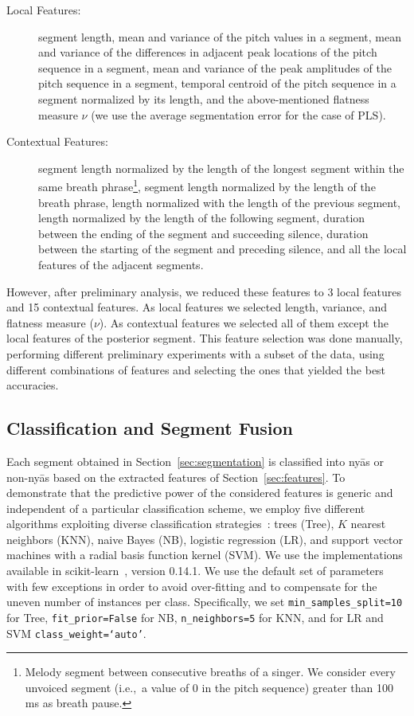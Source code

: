 \begin{description}
	\item[Local Features:] segment length, mean and variance of the pitch values in a segment, mean and variance of the differences in adjacent peak locations of the pitch sequence in a segment, mean and variance of the  peak amplitudes of the pitch sequence in a segment, temporal centroid of the pitch sequence in a segment normalized by its length, and the above-mentioned flatness measure $\nu$ (we use the average segmentation error for the case of PLS).
	\item[Contextual Features:] segment length normalized by the length of the longest segment within the same breath phrase\footnote{Melody segment between consecutive breaths of a singer. We consider every unvoiced segment (i.e.,~a value of 0 in the pitch sequence) greater than 100\,ms as breath pause.}, segment length normalized by the length of the breath phrase, length normalized with the length of the previous segment, length normalized by the length of the following segment, duration between the ending of the segment and succeeding silence, duration between the starting of the segment and preceding silence, and all the local features of the adjacent segments.
\end{description}

However, after preliminary analysis, we reduced these features to 3 local features and 15 contextual features. As local features we selected length, variance, and flatness measure ($\nu$). As contextual features we selected all of them except the local features of the posterior segment. This feature selection was done manually, performing different preliminary experiments with a subset of the data, using different combinations of features and selecting the ones that yielded the best accuracies.

\subsection{Classification and Segment Fusion}

Each segment obtained in Section~\ref{sec:segmentation} is classified into ny\={a}s or non-ny\={a}s based on the extracted features of Section~\ref{sec:features}. To demonstrate that the predictive power of the considered features is generic and independent of a particular classification scheme, we employ five different algorithms exploiting diverse classification strategies~\cite{Hastie09BOOK}: trees (Tree), $K$ nearest neighbors (KNN), naive Bayes (NB), logistic regression (LR), and support vector machines with a radial basis function kernel (SVM). We use the implementations available in scikit-learn~\cite{scikitlearn}, version 0.14.1. We use the default set of parameters with few exceptions in order to avoid over-fitting and to compensate for the uneven number of instances per class. Specifically, we set \texttt{min\_samples\_split=10} for Tree, \texttt{fit\_prior=False} for NB, \texttt{n\_neighbors=5} for KNN, and for LR and SVM \texttt{class\_weight=`auto'}.

